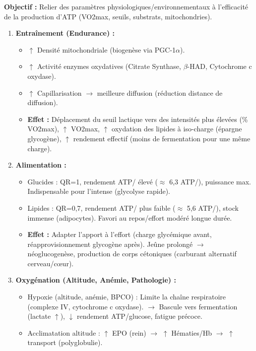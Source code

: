 \documentclass[11pt]{article}
\begin{document}
\begin{methode}
    \textbf{Objectif :} Relier des paramètres physiologiques/environnementaux à l'efficacité de la production d'ATP (VO2max, seuils, substrats, mitochondries).
    \begin{enumerate}
        \item \textbf{Entraînement (Endurance) :}
              \begin{itemize}
                  \item $\uparrow$ Densité mitochondriale (biogenèse via PGC-1$\alpha$).
                  \item $\uparrow$ Activité enzymes oxydatives (Citrate Synthase, $\beta$-HAD, Cytochrome c oxydase).
                  \item $\uparrow$ Capillarisation $\to$ meilleure diffusion  (réduction distance de diffusion).
                  \item \textbf{Effet :} Déplacement du seuil lactique vers des intensités plus élevées (\% VO2max), $\uparrow$ VO2max, $\uparrow$ oxydation des lipides à iso-charge (épargne glycogène), $\uparrow$ rendement effectif (moins de fermentation pour une même charge).
              \end{itemize}
        \item \textbf{Alimentation :}
              \begin{itemize}
                  \item Glucides : QR=1, rendement ATP/ élevé ($\approx$ 6,3 ATP/), puissance max. Indispensable pour l'intense (glycolyse rapide).
                  \item Lipides : QR=0,7, rendement ATP/ plus faible ($\approx$ 5,6 ATP/), stock immense (adipocytes). Favori au repos/effort modéré longue durée.
                  \item \textbf{Effet :} Adapter l'apport à l'effort (charge glycémique avant, réapprovisionnement glycogène après). Jeûne prolongé $\to$ néoglucogenèse, production de corps cétoniques (carburant alternatif cerveau/cœur).
              \end{itemize}
        \item \textbf{Oxygénation (Altitude, Anémie, Pathologie) :}
              \begin{itemize}
                  \item Hypoxie (altitude, anémie, BPCO) : Limite la chaîne respiratoire (complexe IV, cytochrome c oxydase). $\to$ Bascule vers fermentation (lactate $\uparrow$), $\downarrow$ rendement ATP/glucose, fatigue précoce.
                  \item Acclimatation altitude : $\uparrow$ EPO (rein) $\to$ $\uparrow$ Hématies/Hb $\to$ $\uparrow$ transport  (polyglobulie).
              \end{itemize}
    \end{enumerate}
\end{methode}
\end{document}

